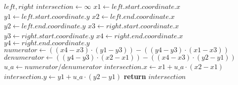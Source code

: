 \begin{algorithm}[ht]
\caption{}
\label{alg:linesegmenintersection}
\begin{algorithmic}[1]
	\Require $\mathit{left}, \mathit{right}$
	\State $\mathit{intersection} \gets \infty$
	\State $\mathit{x1} \gets \mathit{left.start.coordinate.x}$
	\State $\mathit{y1} \gets \mathit{left.start.coordinate.y}$
	\State $\mathit{x2} \gets \mathit{left.end.coordinate.x}$
	\State $\mathit{y2} \gets \mathit{left.end.coordinate.y}$
	\State $\mathit{x3} \gets \mathit{right.start.coordinate.x}$
	\State $\mathit{y3} \gets \mathit{right.start.coordinate.y}$
	\State $\mathit{x4} \gets \mathit{right.end.coordinate.x}$
	\State $\mathit{y4} \gets \mathit{right.end.coordinate.y}$
	\State $\mathit{numerator} \gets ((\mathit{x4} - \mathit{x3}) \cdot (\mathit{y1} - \mathit{y3})) - ((\mathit{y4} - \mathit{y3}) \cdot (\mathit{x1} - \mathit{x3}))$
	\State $\mathit{denumerator} \gets ((\mathit{y4} - \mathit{y3}) \cdot (\mathit{x2} - \mathit{x1})) - ((\mathit{x4} - \mathit{x3}) \cdot (\mathit{y2} - \mathit{y1}))$
	\State $\mathit{u\_a} \gets \mathit{numerator} / \mathit{denumerator}$
	\State $\mathit{intersection.x} \gets \mathit{x1} + \mathit{u\_a} \cdot (\mathit{x2} - \mathit{x1})$
	\State $\mathit{intersection.y} \gets \mathit{y1} + \mathit{u\_a} \cdot (\mathit{y2} - \mathit{y1})$
	\State \textbf{return} $\mathit{intersection}$
\end{algorithmic}
\end{algorithm}
